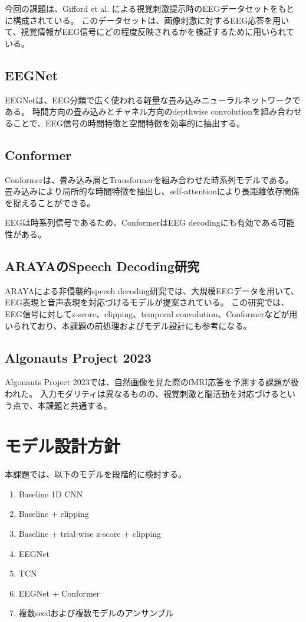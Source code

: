 \documentclass[a4paper,11pt]{jsarticle}
\begin{document}
今回の課題は、Gifford et al. による視覚刺激提示時のEEGデータセットをもとに構成されている。
このデータセットは、画像刺激に対するEEG応答を用いて、視覚情報がEEG信号にどの程度反映されるかを検証するために用いられている。

\subsection{EEGNet}

EEGNetは、EEG分類で広く使われる軽量な畳み込みニューラルネットワークである。
時間方向の畳み込みとチャネル方向のdepthwise convolutionを組み合わせることで、EEG信号の時間特徴と空間特徴を効率的に抽出する。

\subsection{Conformer}

Conformerは、畳み込み層とTransformerを組み合わせた時系列モデルである。
畳み込みにより局所的な時間特徴を抽出し、self-attentionにより長距離依存関係を捉えることができる。

EEGは時系列信号であるため、ConformerはEEG decodingにも有効である可能性がある。

\subsection{ARAYAのSpeech Decoding研究}

ARAYAによる非侵襲的speech decoding研究では、大規模EEGデータを用いて、EEG表現と音声表現を対応づけるモデルが提案されている。
この研究では、EEG信号に対してz-score、clipping、temporal convolution、Conformerなどが用いられており、本課題の前処理およびモデル設計にも参考になる。

\subsection{Algonauts Project 2023}

Algonauts Project 2023では、自然画像を見た際のfMRI応答を予測する課題が扱われた。
入力モダリティは異なるものの、視覚刺激と脳活動を対応づけるという点で、本課題と共通する。

\section{モデル設計方針}

本課題では、以下のモデルを段階的に検討する。

\begin{enumerate}
    \item Baseline 1D CNN
    \item Baseline + clipping
    \item Baseline + trial-wise z-score + clipping
    \item EEGNet
    \item TCN
    \item EEGNet + Conformer
    \item 複数seedおよび複数モデルのアンサンブル
\end{enumerate}
\end{document}
